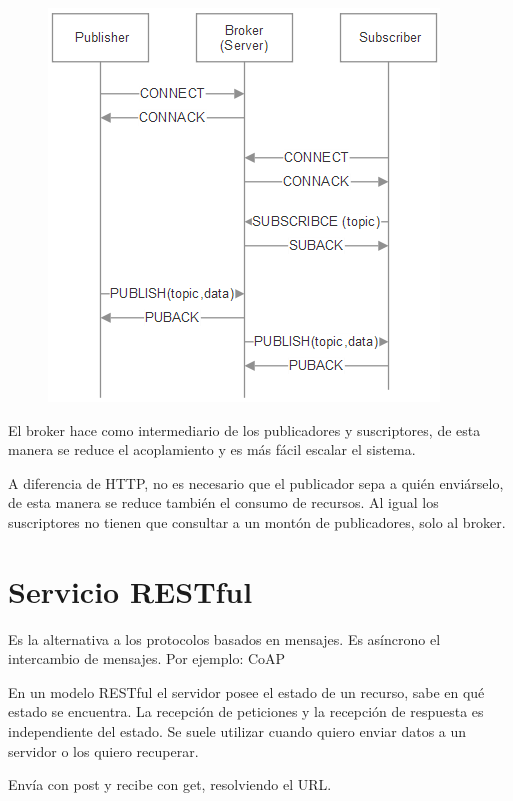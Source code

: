 \documentclass[12pt, twoside, openright]{report} %
\begin{document}
\begin{figure}[H]
	{\includegraphics[scale=.5]{2021-04-08 09_17_44-2021-04-07 17-01-12.mkv.png}
	\def\svgwidth{.6\textwidth}
     }
\end{figure}

El broker hace como intermediario de los publicadores y suscriptores, de esta manera se reduce el acoplamiento y es más fácil escalar el sistema.

A diferencia de HTTP, no es necesario que el publicador sepa a quién enviárselo, de esta manera se reduce también el consumo de recursos. Al igual los suscriptores no tienen que consultar a un montón de publicadores, solo al broker.

\section{Servicio RESTful}

Es la alternativa a los protocolos basados en mensajes. Es asíncrono el intercambio de mensajes. Por ejemplo: CoAP

En un modelo RESTful el servidor posee el estado de un recurso, sabe en qué estado se encuentra.
La recepción de peticiones y la recepción de respuesta es independiente del estado. Se suele utilizar cuando quiero enviar datos a un servidor o los quiero recuperar.

Envía con post y recibe con get, resolviendo el URL.
\end{document}

